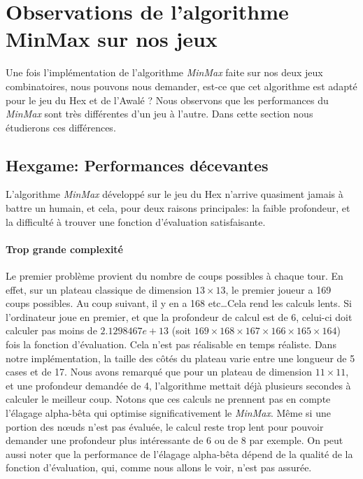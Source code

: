 




\section{Observations de l'algorithme MinMax sur nos jeux}
Une fois l'implémentation de l'algorithme \emph{MinMax} faite sur nos deux
jeux combinatoires, nous pouvons nous demander, est-ce que cet algorithme est adapté pour le jeu du Hex et de l'Awalé ?
Nous observons que les performances du \emph{MinMax} sont très différentes d'un jeu à l'autre. Dans cette section nous étudierons ces différences.

\subsection{Hexgame: Performances décevantes}
L'algorithme \emph{MinMax} développé sur le jeu du Hex n'arrive quasiment jamais à battre un humain, et cela, pour
deux raisons principales: la faible profondeur, et la difficulté à trouver une fonction d'évaluation satisfaisante.

\paragraph{Trop grande complexité} Le premier problème provient du nombre de coups possibles à chaque tour.
En effet, sur un plateau classique de dimension $13\times13$, le premier joueur a 169 coups possibles. Au coup suivant, il y en a 168 etc\dots Cela rend les calculs lents. 
Si l'ordinateur joue en premier, et que la profondeur de calcul est de 6, celui-ci doit calculer pas moins de $2.1298467e+13$ (soit $169\times168\times167\times166\times165\times164$)
fois la fonction d'évaluation. Cela n'est pas réalisable en temps réaliste. Dans notre implémentation, la taille des côtés du plateau varie entre
une longueur de 5 cases et de 17. Nous avons remarqué que pour un plateau de dimension $11\times11$, et une profondeur demandée de 4, l'algorithme
mettait déjà plusieurs secondes à calculer le meilleur coup. Notons que ces calculs ne prennent pas en compte l'élagage alpha-bêta
qui optimise significativement le \emph{MinMax}. Même si une portion des nœuds n'est pas évaluée, le calcul reste trop lent pour pouvoir demander une
profondeur plus intéressante de 6 ou de 8 par exemple.
On peut aussi noter que la performance de l'élagage alpha-bêta dépend de la qualité de la fonction d'évaluation, qui, comme nous allons
le voir, n'est pas assurée.

